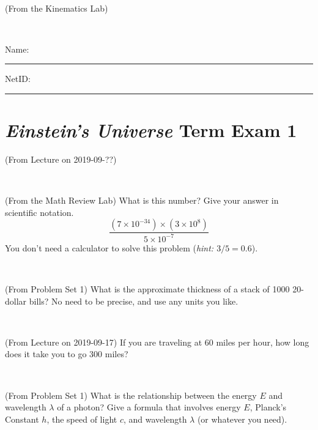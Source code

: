\documentclass[12pt, letterpaper]{article}
\begin{document}
\vfill ~

\begin{problem} (From the Kinematics Lab)

\end{problem}


\vfill ~


\cleardoublepage



\noindent
Name: \rule[-1ex]{0.60\textwidth}{0.1pt}
NetID: \rule[-1ex]{0.20\textwidth}{0.1pt}

\section*{\textsl{Einstein's Universe} Term Exam 1}
\setcounter{problem}{1}


\begin{problem} (From Lecture on 2019-09-??)
\end{problem}


\vfill ~

\begin{problem} (From the Math Review Lab)
What is this number? Give your answer in scientific notation.
$$
\frac{(7\times10^{-34})\times(3\times10^8)}{5\times10^{-7}}
$$
You don't need a calculator to solve this problem (\textit{hint: $3/5=0.6$}).
\end{problem}


\vfill ~

\begin{problem} (From Problem Set 1)
What is the approximate thickness of a stack of 1000 20-dollar bills?
No need to be precise, and use any units you like.
\end{problem}


\vfill ~

\begin{problem} (From Lecture on 2019-09-17)
If you are traveling at 60 miles per hour, how long does
it take you to go 300 miles?
\end{problem}


\vfill ~


\clearpage


\begin{problem} (From Problem Set 1)
What is the relationship between the energy $E$ and wavelength
$\lambda$ of a photon? Give a formula that involves energy $E$,
Planck's Constant $h$, the speed of light $c$, and wavelength
$\lambda$ (or whatever you need).
\end{problem}
\end{document}
